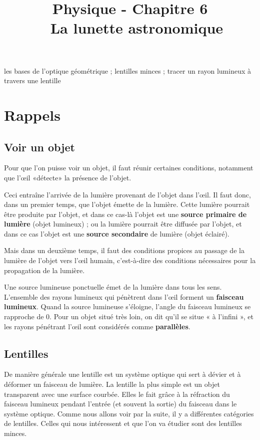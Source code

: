 \documentclass[11pt,a4paper]{article}
\title{\large Physique - Chapitre 6 \\ \LARGE  La lunette astronomique}
\date{}
\author{}
\begin{document}
\maketitle
\vspace{-1cm}
\begin{tcolorbox}[title=Notions de la classe de première à rappeler]
les bases de l'optique géométrique ; lentilles minces ; tracer un rayon lumineux à travers une lentille
\end{tcolorbox}
\tableofcontents

\section{Rappels}

\subsection{Voir un objet}

Pour que l’on puisse voir un objet, il faut réunir certaines conditions, notamment que l’œil «détecte» la présence de l’objet.  

Ceci entraîne l’arrivée de la lumière provenant de l’objet dans l'\oe il. Il faut donc, dans un premier temps, que l’objet émette de la lumière. Cette lumière pourrait être produite par l’objet, et dans ce cas-là l’objet est une \textbf{source primaire de lumière} (objet lumineux) ; ou la lumière pourrait être diffusée par l’objet, et dans ce cas l’objet est une \textbf{source secondaire} de lumière (objet éclairé). 

Mais dans un deuxième temps, il faut des conditions propices au passage de la lumière de l’objet vers l’œil humain, c’est-à-dire des conditions nécessaires pour la propagation de la lumière.  

Une source lumineuse ponctuelle émet de la lumière dans tous les sens. L'ensemble des rayons lumineux qui pénètrent dans l’œil forment un \textbf{faisceau lumineux}. Quand la source lumineuse s’éloigne, l’angle du faisceau lumineux se rapproche de 0\degree. Pour un objet situé très loin, on dit qu'il se situe « à l’infini », et les rayons pénétrant l’œil sont considérés comme \textbf{parallèles}. 

\subsection{Lentilles}

De manière générale une lentille  est un système optique qui sert à dévier et à déformer un faisceau de lumière. La lentille la plus simple est un objet transparent avec une surface courbée. Elles le fait grâce à la réfraction du faisceau lumineux pendant l'entrée (et souvent la sortie) du faisceau dans le système optique. Comme nous allons voir par la suite, il y a différentes catégories de lentilles. Celles qui nous intéressent et que l'on va étudier sont des lentilles minces. 
\end{document}
